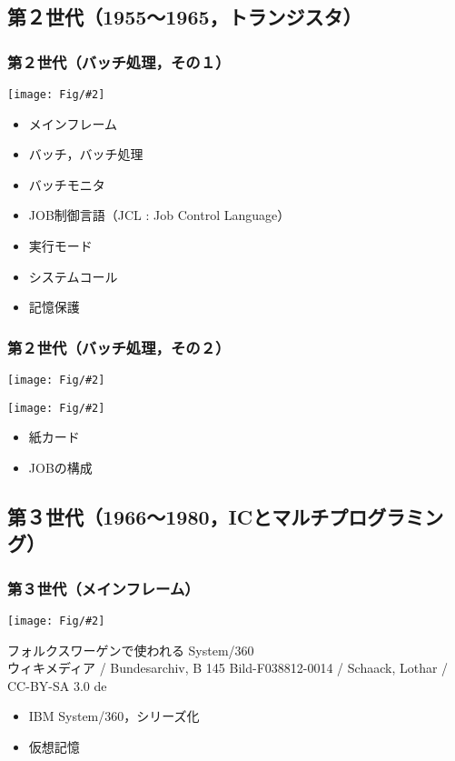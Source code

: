 \documentclass[dvipdfmx]{beamer}
\newcommand{\fig}[2]{\begin{center}\texttt{[image: Fig/\#2]}\end{center}}
\begin{document}
\subsection{第２世代（1955〜1965，トランジスタ）}
\begin{frame}
  \frametitle{第２世代（バッチ処理，その１）}
  \fig{scale=0.4}{batch-crop.pdf}
  \begin{itemize}
    \item メインフレーム
    \item バッチ，バッチ処理
    \item バッチモニタ
    \item JOB制御言語（JCL :  Job Control Language）
    \item 実行モード
    \item システムコール
    \item 記憶保護
  \end{itemize}
\end{frame}

\begin{frame}
  \frametitle{第２世代（バッチ処理，その２）}
  \fig{scale=0.15}{punchcard.jpg}
  \fig{scale=0.4}{job-crop.pdf}
  \begin{itemize}
    \item 紙カード
    \item JOBの構成
  \end{itemize}
\end{frame}

\subsection{第３世代（1966〜1980，ICとマルチプログラミング）}
\begin{frame}
  \frametitle{第３世代（メインフレーム）}
  \fig{scale=0.2}
      {Bundesarchiv_B_145_Bild-F038812-0014,_Wolfsburg,_VW_Autowerk.jpg}
      {\tiny
        \begin{center}
        フォルクスワーゲンで使われる System/360 \\
        ウィキメディア /
        Bundesarchiv, B 145 Bild-F038812-0014 /
        Schaack, Lothar / CC-BY-SA 3.0 de
        \end{center}
      }
  \begin{itemize}
    \item IBM System/360，シリーズ化
    \item 仮想記憶
  \end{itemize}
\end{frame}
\end{document}
